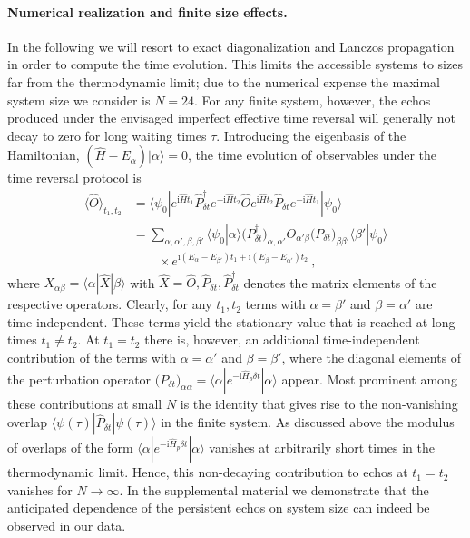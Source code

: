 \documentclass[%
 reprint,
unsortedaddress,
 amsmath,amssymb,
 prl,
]{revtex4-1}
\newcommand{\im}{\mathrm{i}}
\begin{document}
\paragraph{Numerical realization and finite size effects.}
In the following we will resort to exact diagonalization and Lanczos propagation \cite{Park1986} in
order to compute the time evolution. This
limits the accessible systems to sizes far from the thermodynamic limit; due to the numerical
expense the maximal system size we consider is $N=24$.
For any finite system, however, the echos produced under the envisaged imperfect effective time reversal
will generally not decay to zero for long waiting times $\tau$. 
Introducing the eigenbasis of the Hamiltonian, $(\hat H-E_{\alpha})|\alpha\rangle=0$, the time evolution
of observables under the time reversal protocol is
\begin{align}
	\langle\hat O\rangle_{t_1,t_2}&=
	\langle\psi_0|e^{\im\hat Ht_1}\hat P_{\delta t}^\dagger e^{-\im\hat Ht_2}\hat O
	e^{\im\hat Ht_2}\hat P_{\delta t}e^{-\im\hat Ht_1}|\psi_0\rangle
	\nonumber\\&
	=
	\sum_{\alpha,\alpha',\beta,\beta'}
	\langle\psi_0|\alpha\rangle\big(P_{\delta t}^\dagger\big)_{\alpha,\alpha'} O_{\alpha'\beta}
	\big(P_{\delta t}\big)_{\beta\beta'}\langle\beta'|\psi_0\rangle
	\nonumber\\&\quad\quad
	\times e^{\im(E_\alpha-E_{\beta'}) t_1+\im(E_\beta-E_{\alpha'})t_2}\ ,
\end{align}
where $X_{\alpha\beta}=\langle\alpha|\hat X|\beta\rangle$ with 
$\hat X=\hat O,\hat P_{\delta t}, \hat P_{\delta t}^\dagger$ denotes the matrix elements of the respective operators. Clearly, for any $t_1,t_2$ terms with $\alpha=\beta'$ and $\beta=\alpha'$ are time-independent.
These terms yield the stationary value that is reached at long times $t_1\neq t_2$.
At $t_1=t_2$ there is, however, an additional time-independent contribution of the terms with
$\alpha=\alpha'$ and $\beta=\beta'$, where the diagonal elements of the perturbation operator
$\big(P_{\delta t}\big)_{\alpha\alpha}=\langle\alpha|e^{-\im\hat H_p\delta t}|\alpha\rangle$ appear.
Most prominent among these contributions at small $N$ is the identity that gives rise to the non-vanishing
overlap $\langle\psi(\tau)|\hat P_{\delta t}|\psi(\tau)\rangle$ in the finite system.
As discussed above the modulus of overlaps of the form 
$\langle\alpha|e^{-\im\hat H_p\delta t}|\alpha\rangle$
vanishes at arbitrarily short times in the thermodynamic
limit. Hence, this non-decaying contribution to echos at $t_1=t_2$ vanishes for $N\to\infty$.
In the supplemental material \cite{supplement} we demonstrate that the anticipated dependence of the persistent echos on system size can indeed be observed in our data.
\end{document}
